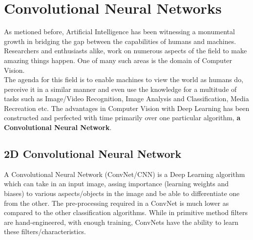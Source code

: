 \documentclass{report}
\begin{document}
\chapter {Convolutional Neural Networks}
As metioned before, Artificial Intelligence has been witnessing a monumental growth in bridging the gap between the capabilities of humans
and machines. Researchers and enthusiasts alike, work on numerous aspects of the field to make amazing things happen. One of many such areas
is the domain of Computer Vision. \\
The agenda for this field is to enable machines to view the world as humans do, perceive it in a similar manner and even use the
knowledge for a multitude of tasks such as Image/Video Recognition, Image Analysis and Classification, Media Recreation etc. The
advantages in Computer Vision with Deep Learning has been constructed and perfected with time primarily over one particular algorithm,
\textbf{a Convolutional Neural Network}.

\section {2D Convolutional Neural Network}
A Convolutional Neural Network (ConvNet/CNN) is a Deep Learning algorithm which can take in an input image, assing importance (learning
weights and biases) to various aspects/objects in the image and be able to differentiate one from the other. The pre-processing required
in a ConvNet is much lower as compared to the other classification algorithms. While in primitive method filters are hand-engineered,
with enough training, ConvNets have the ability to learn these filters/characteristics.
\end{document}
